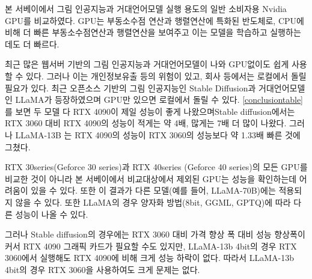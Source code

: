 본 서베이에서 그림 인공지능과 거대언어모델 실행 용도의 일반 소비자용 Nvidia GPU를 비교하였다. GPU는 부동소수점 연산과 행렬연산에 특화된 반도체로, CPU에 비해 더 빠른 부동소수점연산과 행렬연산을 보여주고 이는 모델을 학습하고 실행하는데도 더 빠르다.     

최근 많은 웹서버 기반의 그림 인공지능과 거대언어모델이 나와 GPU없이도 쉽게 사용할 수 있다. 그러나 이는 개인정보유출 등의 위험이 있고, 회사 등에서는 로컬에서 돌릴 필요가 있다. 최근 오픈소스 기반의 그림 인공지능인 Stable Diffusion과 거대언어모델인 LLaMA가 등장하였으며 GPU만 있으면 로컬에서 돌릴 수 있다. \ref{conclusiontable}를 보면
두 모델 다 RTX 4090이 제일 성능이 좋게 나왔으며Stable diffusion에서는 RTX 3060 대비 RTX 4090의 성능이 적게는 약 4배, 많게는 7배 더 많이 나왔다. 그러나 LLaMA-13B 는 RTX 4090의 성능이 RTX 3060의 성능보다 약 1.33배 빠른 것에 그쳤다.

 RTX 30series(Geforce 30 series)과 RTX 40series (Geforce 40 series)의 모든 GPU를 비교한 것이 아니라 본 서베이에서 비교대상에서 제외된 GPU는 성능을 확인하는데 어려움이 있을 수 있다. 또한 이 결과가 다른 모델(예를 들어, LLaMA-70B)에는 적용되지 않을 수 있다. 또한 LLaMA의 경우 양자화 방법(8bit, GGML, GPTQ)에 따라 다른 성능이 나올 수 있다. 
 
그러나 Stable diffusion의 경우에는 RTX 3060 대비 가격 향상 폭 대비 성능 향상폭이 커서 RTX 4090 그래픽 카드가 필요할 수도 있지만, LLaMA-13b 4bit의 경우 RTX 3060에서 실행해도 RTX 4090에 비해 크게 성능 하락이 없다. 따라서 LLaMA-13b 4bit의 경우 RTX 3060을 사용하여도 크게 문제는 없다.
